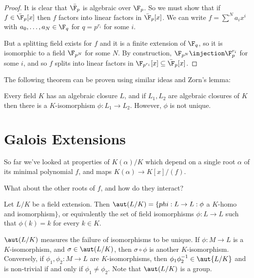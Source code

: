 \documentclass[a4paper, 10pt, twocolumn]{amsart}
\begin{document}
\begin{proof}
It is clear that $\bar{\F_p}$ is algebraic over $\F_p$. So we must show that if $f \in \bar{\F}_p[x]$ then $f$ factors into linear factors in $\bar{\F}_p[x]$. We can write $f = \sum^N a_i x^i$ with $a_0, \ldots, a_N \in \F_q$ for $q=p^{r_i}$ for some $i$.

But a splitting field exists for $f$ and it is a finite extension of $\F_q$, so it is isomorphic to a field $\F_{p^N}$ for some $N$. By construction, $\F_{p^N} \injection \F_p^{r_i}$ for some $i$, and so $f$ splits into linear factors in $\F_{p^{r_i}}[x] \subseteq \bar{\F}_p[x]$.
\end{proof}
The following theorem can be proven using similar ideas and Zorn's lemma:
\begin{theorem}
Every field $K$ has an algebraic closure $L$, and if $L_1, L_2$ are algebraic closures of $K$ then there is a $K$-isomorphism $\phi:L_1\to L_2$. However, $\phi$ is not unique.
\end{theorem}

\section{Galois Extensions}
So far we've looked at properties of $K(\alpha)/K$ which depend on a single root $\alpha$ of its minimal polynomial $f$, and maps $K(\alpha) \to K[x]/(f)$.

What about the other roots of $f$, and how do they interact?

Let $L/K$ be a field extension. Then $\aut(L/K) = \{phi : L \to L : \phi $ a $K$-homo and isomorphism$\}$, or equivalently the set of field isomorphisms $\phi:L\to L$ such that $\phi(k) = k$ for every $k \in K$.

$\aut(L/K)$ measures the failure of isomorphisms to be unique. If $\phi : M \to L$ is a $K$-isomorphism, and $\sigma \in \aut(L/K)$, then $\sigma \circ \phi$ is another $K$-isomorphism. Conversely, if $\phi_1, \phi_2: M \to L$ are $K$-isomorphisms, then $\phi_1 \phi_2^{-1} \in \aut{L/K}$ and is non-trivial if and only if $\phi_1 \neq \phi_2$. Note that $\aut(L/K)$ is a group.
\end{document}
